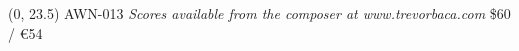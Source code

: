 \documentclass[10pt]{article}
\begin{document}
\begin{textblock}{23}(0, 23.5)
AWN-013 \hfill
\textit{Scores available from the composer at www.trevorbaca.com} \hfill
\$60 / \euro 54
\end{textblock}
\end{document}
